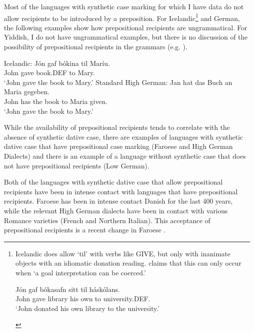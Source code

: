 \documentclass[11pt]{upenndiss}
\begin{document}
Most of the languages with synthetic case marking for which I have data do not allow recipients to be introduced by a preposition. For Icelandic\footnote{Icelandic does allow `til' with verbs like GIVE, but only with inanimate objects with an idiomatic donation reading. \cite{Thrainsson.2007} claims that this can only occur when `a goal interpretation can be coerced.'
\begin{exe}
	\ex \gll J\'on gaf b\'okasafn sitt til h\'ask\'olans.\\
	John gave library {his own} to university.DEF.\\
\trans `John donated his own library to the university.'
\end{exe}} and German, the following examples show how prepositional recipients are ungrammatical. For Yiddish, I do not have ungrammatical examples, but there is no discussion of the possibility of prepositional recipients in the grammars (e.g. \citet{Birnbaum.1979}).

\begin{exe}
	\ex
	\begin{xlist}
		\ex Icelandic:
	\gll *J\'on gaf b\'okina til Mar\'iu.\\
		 John gave book.DEF to Mary.\\
		 \trans `John gave the book to Mary.'
		\ex Standard High German:
		\gll *Jan hat das Buch an Maria gegeben.\\
		 John has the book to Maria given.\\
		 \trans `John gave the book to Mary.'
	\end{xlist}
\end{exe}

While the availability of prepositional recipients tends to correlate with the absence of synthetic dative case, there are examples of languages with synthetic dative case that have prepositional case marking (Faroese and High German Dialects) and there is an example of a language without synthetic case that does not have prepositional recipients (Low German). 

Both of the languages with synthetic dative case that allow prepositional recipients have been in intense contact with languages that have prepositional recipients. Faroese has been in intense contact Danish for the last 400 years, while the relevant High German dialects have been in contact with various Romance varieties (French and Northern Italian). This acceptance of prepositional recipients is a recent change in Faroese \citep{Thrainsson.2007,Lundquist.2013b}.
\end{document}
